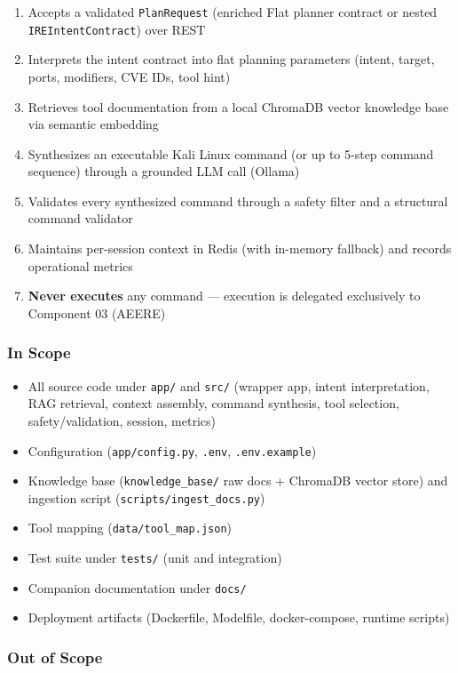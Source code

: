 \documentclass[10pt,journal,onecolumn]{IEEEtran}
\begin{document}
\begin{enumerate}
\item Accepts a validated \texttt{PlanRequest} (enriched Flat planner contract or nested \texttt{IREIntentContract}) over REST
\item Interprets the intent contract into flat planning parameters (intent, target, ports, modifiers, CVE IDs, tool hint)
\item Retrieves tool documentation from a local ChromaDB vector knowledge base via semantic embedding
\item Synthesizes an executable Kali Linux command (or up to 5-step command sequence) through a grounded LLM call (Ollama)
\item Validates every synthesized command through a safety filter and a structural command validator
\item Maintains per-session context in Redis (with in-memory fallback) and records operational metrics
\item \textbf{Never executes} any command --- execution is delegated exclusively to Component 03 (AEERE)
\end{enumerate}

\subsubsection{In Scope}

\begin{itemize}
\item All source code under \texttt{app/} and \texttt{src/} (wrapper app, intent interpretation, RAG retrieval, context assembly, command synthesis, tool selection, safety/validation, session, metrics)
\item Configuration (\texttt{app/config.py}, \texttt{.env}, \texttt{.env.example})
\item Knowledge base (\texttt{knowledge\_base/} raw docs + ChromaDB vector store) and ingestion script (\texttt{scripts/ingest\_docs.py})
\item Tool mapping (\texttt{data/tool\_map.json})
\item Test suite under \texttt{tests/} (unit and integration)
\item Companion documentation under \texttt{docs/}
\item Deployment artifacts (Dockerfile, Modelfile, docker-compose, runtime scripts)
\end{itemize}

\subsubsection{Out of Scope}
\end{document}
